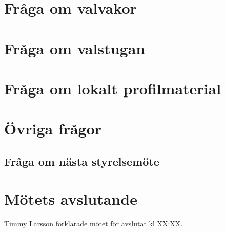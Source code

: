\documentclass[a4paper,10pt]{article}
\begin{document}
\section{Fråga om valvakor}


\section{Fråga om valstugan}


\section{Fråga om lokalt profilmaterial}


\section{Övriga frågor}
\subsection*{Fråga om nästa styrelsemöte}


\section{Mötets avslutande}
Timmy Larsson förklarade mötet för avslutat kl XX:XX.
\end{document}
